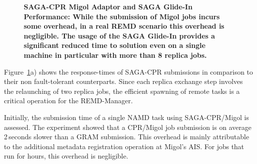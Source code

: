 \documentclass{rspublic}
\begin{document}
\begin{figure}[ht]
    \centering
    \caption{\footnotesize \bf SAGA-CPR Migol Adaptor and SAGA Glide-In Performance: While the submission of Migol jobs incurs some overhead, in a real REMD scenario this overhead is negligible. The usage of the SAGA Glide-In provides a significant reduced time to solution even on a single machine in particular with more than 8 replica jobs.}       
    \label{fig:performance_perf_submission}
\end{figure}           

Figure~\ref{fig:performance_perf_submission}a) shows the response-times
of SAGA-CPR submissions in comparison to their non fault-tolerant
counterparts. Since each replica exchange step involves the
relaunching of two replica jobs, the efficient spawning of remote
tasks is a critical operation for the REMD-Manager.

Initially, the submission time of a single NAMD task using
SAGA-CPR/Migol is assessed. The experiment showed that a CPR/Migol job
submission is on average 2\,seconds slower than a GRAM
submission. This overhead is mainly attributable to the additional
metadata registration operation at Migol's AIS. For jobs that run for 
hours, this overhead is negligible.
\end{document}
